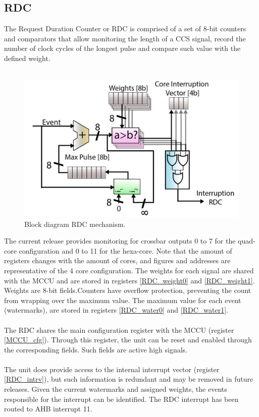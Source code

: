 \subsection{RDC}
The Request Duration Counter or RDC is comprised of a set of 8-bit counters and comparators that allow monitoring the length of a CCS signal, record the number of clock cycles of the longest pulse and compare such value with the defined weight.\\
\\
\begin{figure}[H]
	\begin{center}
	\includegraphics[keepaspectratio,scale=0.15]{img/bd_RDC.png}
	\caption{Block diagram RDC mechanism.}
	\label{fig:blk_RDC}
	\end{center}
\end{figure}

The current release provides monitoring for crossbar outputs 0 to 7 for the quad-core configuration and 0 to 11 for the hexa-core. Note that the amount of registers changes with the amount of cores, and figures and addresses are representative of the 4 core configuration. The weights for each signal are shared with the MCCU and are stored in registers \ref{RDC_weight0} and \ref{RDC_weight1}. Weights are 8-bit fields.Counters have overflow protection, preventing the count from wrapping over the maximum value.  The maximum value for each event (watermarks), are stored in registers \ref{RDC_water0} and \ref{RDC_water1}.\\
\\
The RDC shares the main configuration register with the MCCU (register \ref{MCCU_cfg}). Through this register, the unit can be reset and enabled through the corresponding fields. Such fields are active high signals. \\
\\
The unit does provide access to the internal interrupt vector (register \ref{RDC_intrv}), but such information is redundant and may be removed in future releases. Given the current watermarks and assigned weights, the events responsible for the interrupt can be identified.  The RDC interrupt has been routed to AHB interrupt 11.



